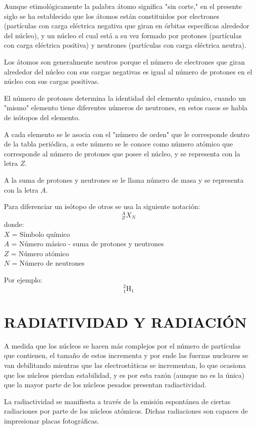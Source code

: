 Aunque etimológicamente la palabra átomo significa "sin corte," en el presente siglo se ha establecido que los átomos están constituidos por electrones (partículas con carga eléctrica negativa que giran en órbitas específicas alrededor del núcleo), y un núcleo el cual está a su vez formado por protones (partículas con carga eléctrica positiva) y neutrones (partículas con carga eléctrica neutra).

Los átomos son generalmente neutros porque el número de electrones que giran alrededor del núcleo con sus cargas negativas es igual al número de protones en el núcleo con sus cargas positivas.

El número de protones determina la identidad del elemento químico, cuando un "mismo" elemento tiene diferentes números de neutrones, en estos casos se habla de isótopos del elemento.

A cada elemento se le asocia con el "número de orden" que le corresponde dentro de la tabla periódica, a este número se le conoce como número atómico que corresponde al número de protones que posee el núcleo, y se representa con la letra $Z$.

A la suma de protones y neutrones se le llama número de masa y se representa con la letra $A$.

Para diferenciar un isótopo de otros se usa la siguiente notación: 
\[
^{A}_{Z}X_{N}
\]
donde: \\
$X$ = Símbolo químico \\
$A$ = Número másico - suma de protones y neutrones \\
$Z$ = Número atómico \\
$N$ = Número de neutrones

Por ejemplo: 
\[
^{2}_{1}\text{H}_{1}
\]

\chapter{RADIATIVIDAD Y RADIACIÓN}

A medida que los núcleos se hacen más complejos por el número de partículas que contienen, el tamaño de estos incrementa y por ende las fuerzas nucleares se van debilitando mientras que las electrostáticas se incrementan, lo que ocasiona que los núcleos pierdan estabilidad, y es por esta razón (aunque no es la única) que la mayor parte de los núcleos pesados presentan radiactividad.

La radiactividad se manifiesta a través de la emisión espontánea de ciertas radiaciones por parte de los núcleos atómicos. Dichas radiaciones son capaces de impresionar placas fotográficas.
